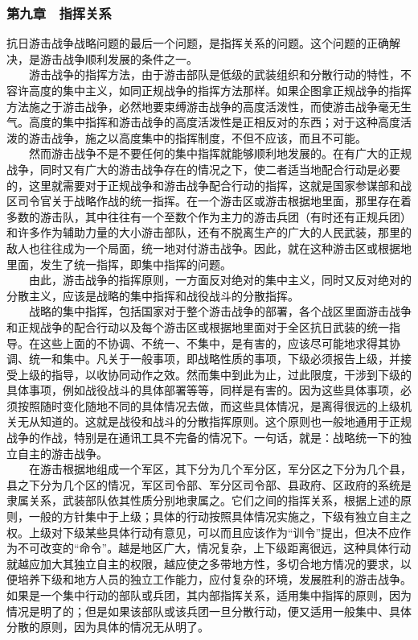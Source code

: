 \documentclass[cn,11pt,chinese]{elegantbook}
\def\myformat#1{\hfil\hfil #1}
\begin{document}
\subsubsection*{\myformat{第九章　指挥关系}}
抗日游击战争战略问题的最后一个问题，是指挥关系的问题。这个问题的正确解决，是游击战争顺利发展的条件之一。\\
　　游击战争的指挥方法，由于游击部队是低级的武装组织和分散行动的特性，不容许高度的集中主义，如同正规战争的指挥方法那样。如果企图拿正规战争的指挥方法施之于游击战争，必然地要束缚游击战争的高度活泼性，而使游击战争毫无生气。高度的集中指挥和游击战争的高度活泼性是正相反对的东西；对于这种高度活泼的游击战争，施之以高度集中的指挥制度，不但不应该，而且不可能。\\
　　然而游击战争不是不要任何的集中指挥就能够顺利地发展的。在有广大的正规战争，同时又有广大的游击战争存在的情况之下，使二者适当地配合行动是必要的，这里就需要对于正规战争和游击战争配合行动的指挥，这就是国家参谋部和战区司令官关于战略作战的统一指挥。在一个游击区或游击根据地里面，那里存在着多数的游击队，其中往往有一个至数个作为主力的游击兵团（有时还有正规兵团）和许多作为辅助力量的大小游击部队，还有不脱离生产的广大的人民武装，那里的敌人也往往成为一个局面，统一地对付游击战争。因此，就在这种游击区或根据地里面，发生了统一指挥，即集中指挥的问题。\\
　　由此，游击战争的指挥原则，一方面反对绝对的集中主义，同时又反对绝对的分散主义，应该是战略的集中指挥和战役战斗的分散指挥。\\
　　战略的集中指挥，包括国家对于整个游击战争的部署，各个战区里面游击战争和正规战争的配合行动以及每个游击区或根据地里面对于全区抗日武装的统一指导。在这些上面的不协调、不统一、不集中，是有害的，应该尽可能地求得其协调、统一和集中。凡关于一般事项，即战略性质的事项，下级必须报告上级，并接受上级的指导，以收协同动作之效。然而集中到此为止，过此限度，干涉到下级的具体事项，例如战役战斗的具体部署等等，同样是有害的。因为这些具体事项，必须按照随时变化随地不同的具体情况去做，而这些具体情况，是离得很远的上级机关无从知道的。这就是战役和战斗的分散指挥原则。这个原则也一般地通用于正规战争的作战，特别是在通讯工具不完备的情况下。一句话，就是：战略统一下的独立自主的游击战争。\\
　　在游击根据地组成一个军区，其下分为几个军分区，军分区之下分为几个县，县之下分为几个区的情况，军区司令部、军分区司令部、县政府、区政府的系统是隶属关系，武装部队依其性质分别地隶属之。它们之间的指挥关系，根据上述的原则，一般的方针集中于上级；具体的行动按照具体情况实施之，下级有独立自主之权。上级对下级某些具体行动有意见，可以而且应该作为“训令”提出，但决不应作为不可改变的“命令”。越是地区广大，情况复杂，上下级距离很远，这种具体行动就越应加大其独立自主的权限，越应使之多带地方性，多切合地方情况的要求，以便培养下级和地方人员的独立工作能力，应付复杂的环境，发展胜利的游击战争。如果是一个集中行动的部队或兵团，其内部指挥关系，适用集中指挥的原则，因为情况是明了的；但是如果该部队或该兵团一旦分散行动，便又适用一般集中、具体分散的原则，因为具体的情况无从明了。\\
\end{document}
